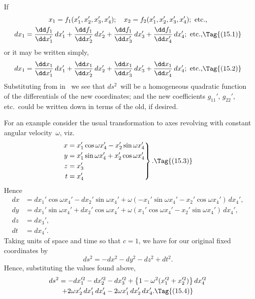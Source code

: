 \documentclass[12pt]{book}
\begin{document}
If
\begin{gather*}
  x_{1} = f_{1}(x_{1}', x_{2}', x_{3}', x_{4}');\quad
  x_{2} = f_{2}(x_{1}', x_{2}', x_{3}', x_{4}'); \text{ etc.,} \\
  dx_{1} = \frac{\dd f_{1}}{\dd x_{1}'}\, dx_{1}'
        + \frac{\dd f_{1}}{\dd x_{2}'}\, dx_{2}'
        + \frac{\dd f_{1}}{\dd x_{3}'}\, dx_{3}'
        + \frac{\dd f_{1}}{\dd x_{4}'}\, dx_{4}'; \text{ etc.,}
  \Tag{(15.1)}
\end{gather*}
or it may be written simply,
\[
dx_{1} = \frac{\dd x_{1}}{\dd x_{1}'}\, dx_{1}'
  + \frac{\dd x_{1}}{\dd x_{2}'}\, dx_{2}'
  + \frac{\dd x_{1}}{\dd x_{3}'}\, dx_{3}'
  + \frac{\dd x_{1}}{\dd x_{4}'}\, dx_{4}'; \text{ etc.,}
  \Tag{(15.2)}
\]
Substituting from  in~ we see that $ds^2$~will be a homogeneous
quadratic function of the differentials of the new coordinates; and the new
coefficients $g_{11}'$, $g_{22}'$, etc.\ could be written down in terms of the old, if desired.

For an example consider the usual transformation to axes revolving with
%
constant angular velocity~$\omega$, viz.
\[
\left.
\begin{aligned}
  x &= x_{1}' \cos \omega x_{4}' - x_{2}' \sin \omega x_{4}' \\
  y &= x_{1}' \sin \omega x_{4}' + x_{2}' \cos \omega x_{4}' \\
  z &= x_{3}' \\
  t &= x_{4}'
\end{aligned}
\right\}.
\Tag{(15.3)}
\]
Hence
\begin{align*}
  dx &= dx_1' \cos \omega x_4' - dx_2' \sin \omega x_4'
  + \omega(-x_1' \sin \omega x_4' - x_2' \cos \omega x_4')\, dx_4', \\
  dy &= dx_1' \sin \omega x_4' + dx_2' \cos \omega x_4'
  + \omega( x_1' \cos \omega x_4' - x_2' \sin \omega x_4')\, dx_4', \\
  dz &= dx_3', \\
  dt &= dx_4'.
\end{align*}
Taking units of space and time so that $c = 1$, we have for our original fixed
coordinates by~
\[
ds^2 = -dx^2 - dy^2 - dz^2 + dt^2.
\]
Hence, substituting the values found above,
\begin{multline*}
  ds^2 = - dx_1'^2 - dx_2'^2 - dx_3'^2 + \bigl\{1 - \omega^2 (x_1'^2 + x_2'^2)\bigr\}\, dx_4'^2 \\
  + 2\omega x_2'\, dx_1'\, dx_4' - 2\omega x_1'\, dx_2'\, dx_4'.
  \Tag{(15.4)}
\end{multline*}
\end{document}

